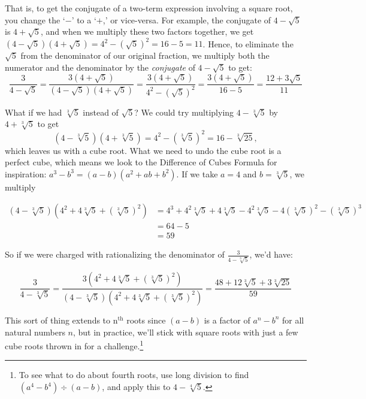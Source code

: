 That is, to get the conjugate of a two-term expression involving a square root, you change the `$-$' to a `$+$,' or vice-versa.  For example, the conjugate of $4 - \sqrt{5}$ is $4 + \sqrt{5}$, and when we multiply these two factors together, we get $(4 - \sqrt{5})(4 + \sqrt{5}) = 4^2 - (\sqrt{5})^2 = 16 - 5 = 11$.  Hence, to eliminate the $\sqrt{5}$ from the denominator of our original fraction, we multiply both the numerator and the denominator by the \textit{conjugate} of $4-\sqrt{5}$ to get: \[\dfrac{3}{4 - \sqrt{5}} = \dfrac{3 (4 + \sqrt{5})}{(4 - \sqrt{5})(4 + \sqrt{5})} = \dfrac{3 (4 + \sqrt{5})}{4^2 - (\sqrt{5})^2} = \dfrac{3(4 + \sqrt{5})}{16 - 5} = \dfrac{12 + 3\sqrt{5}}{11}\] 

What if we had $\sqrt[3]{5}$ instead of $\sqrt{5}$?  We could try multiplying $4 - \sqrt[3]{5}$ by $4 + \sqrt[3]{5}$ to get  \[(4 - \sqrt[3]{5})(4 + \sqrt[3]{5}) = 4^2 - (\sqrt[3]{5})^2 = 16 - \sqrt[3]{25},\] which leaves us with a cube root.  What we need to undo the cube root is a perfect cube, which means we look to the Difference of Cubes Formula for inspiration:  $a^3 - b^3 = (a-b)(a^2+ab+b^2)$.  If we take $a = 4$ and $b = \sqrt[3]{5}$, we multiply 

\begin{align*}
(4 - \sqrt[3]{5})(4^2 + 4\sqrt[3]{5} + (\sqrt[3]{5})^2) &= 4^3 + 4^2\sqrt[3]{5} + 4 \sqrt[3]{5} - 4^2\sqrt[3]{5}-4(\sqrt[3]{5})^2 - (\sqrt[3]{5})^3 \\
&= 64 - 5 \\
&= 59
\end{align*}

So if we were charged with rationalizing the denominator of $\frac{3}{4 - \sqrt[3]{5}}$, we'd have:

\[ \dfrac{3}{4 - \sqrt[3]{5}} = \dfrac{3(4^2 + 4\sqrt[3]{5} + (\sqrt[3]{5})^2)}{(4 - \sqrt[3]{5})(4^2 + 4\sqrt[3]{5} + (\sqrt[3]{5})^2)} = \dfrac{48 + 12\sqrt[3]{5}+ 3\sqrt[3]{25}}{59}\]

This sort of thing extends to $\text{n}^{\text{th}}$ roots since $(a-b)$ is a factor of $a^n - b^n$ for all natural numbers $n$, but in practice, we'll stick with square roots with just a few cube roots thrown in for a challenge.\footnote{To see what to do about fourth roots, use long division to find $(a^4 - b^4) \div (a-b)$, and apply this to $4 - \sqrt[4]{5}$.}

